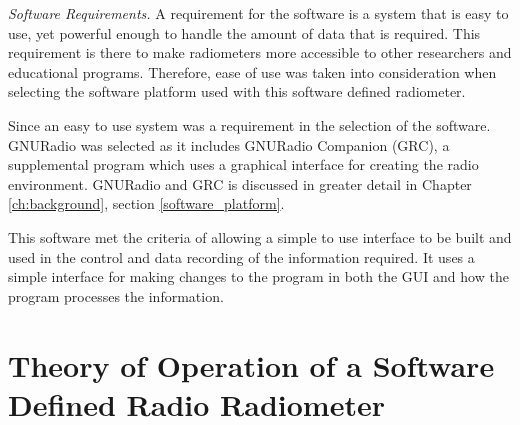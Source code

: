 
\emph{Software Requirements.}  A requirement for the software is a system that is easy to use, yet powerful enough to handle the amount of data that is required.  This requirement is there to make radiometers more accessible to other researchers and educational programs.  Therefore, ease of use was taken into consideration when selecting the software platform used with this software defined radiometer.


Since an easy to use system was a requirement in the selection of the software.  GNURadio was selected as it includes GNURadio Companion (GRC), a supplemental program which uses a graphical interface for creating the radio environment.  GNURadio and GRC is discussed in greater detail in Chapter \ref{ch:background}, section \ref{software_platform}. 

This software met the criteria of allowing a simple to use interface to be built and used in the control and data recording of the information required.  It uses a simple interface for making changes to the program in both the GUI and how the program processes the information.

\section{Theory of Operation of a Software Defined Radio Radiometer}


